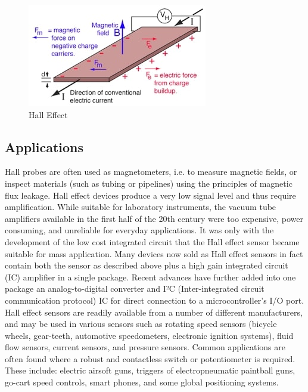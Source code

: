 \documentclass[a4paper, 12pt]{article}
\begin{document}
\begin{figure}[h]
	{\begin{center}
		\includegraphics[scale=0.60]{ME20B004.jpg}
	\end{center}}
	\caption{Hall Effect \cite{pic}}
	\label{f1:image}
\end{figure}


\subsection{Applications}
Hall probes are often used as magnetometers, i.e. to measure magnetic fields, or inspect materials (such as tubing or pipelines) using the principles of magnetic flux leakage.
Hall effect devices produce a very low signal level and thus require amplification. While suitable for laboratory instruments, the vacuum tube amplifiers available in the first half of the 20th century were too expensive, power consuming, and unreliable for everyday applications. It was only with the development of the low cost integrated circuit that the Hall effect sensor became suitable for mass application. Many devices now sold as Hall effect sensors in fact contain both the sensor as described above plus a high gain integrated circuit (IC) amplifier in a single package. Recent advances have further added into one package an analog-to-digital converter and I²C (Inter-integrated circuit communication protocol) IC for direct connection to a microcontroller's I/O port.
Hall effect sensors are readily available from a number of different manufacturers, and may be used in various sensors such as rotating speed sensors (bicycle wheels, gear-teeth, automotive speedometers, electronic ignition systems), fluid flow sensors, current sensors, and pressure sensors. Common applications are often found where a robust and contactless switch or potentiometer is required. These include: electric airsoft guns, triggers of electropneumatic paintball guns, go-cart speed controls, smart phones, and some global positioning systems. \cite{weblink2}



\end{document}
